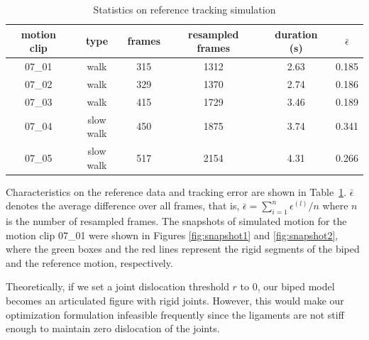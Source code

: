 \documentclass[master,english,final]{kaist-ucs}
\begin{document}
\begin{table}[h!]
\centering
  \begin{tabular}{cccccc}
  motion clip                      &  type         & frames  & resampled frames & duration (s) & $\bar{\epsilon}$\\
  \hline
  07\_01                           &  walk         & 315     & 1312             & 2.63     &     0.185           \\
  07\_02                           &  walk         & 329     & 1370             & 2.74     &     0.186           \\
  07\_03                           &  walk         & 415     & 1729             & 3.46     &     0.189           \\
  07\_04                           &  slow walk    & 450     & 1875             & 3.74     &     0.341           \\
  07\_05                           &  slow walk    & 517     & 2154             & 4.31     &     0.266           \\
  \hline
\end{tabular}
\caption{Statistics on reference tracking simulation}
\label{stat}
\end{table}

Characteristics on the reference data and tracking error are shown in Table~\ref{stat}.
$\bar{\epsilon}$ denotes the average difference over all frames, that is,
$\bar{\epsilon} = \sum_{i=1}^{n}\epsilon^{(l)}/n$ where $n$ is the number of
resampled frames. The snapshots of simulated motion for the motion clip 07\_01 were
shown in Figures \ref{fig:snapshot1} and \ref{fig:snapshot2},
where the green boxes and the red lines represent the rigid segments of the biped and
the reference motion, respectively.




Theoretically, if we set a joint dislocation threshold $r$ to 0, our
biped model becomes an articulated figure with rigid joints.
However, this would make our optimization formulation infeasible frequently
since the ligaments are not stiff enough to maintain zero dislocation of the joints.
\end{document}
